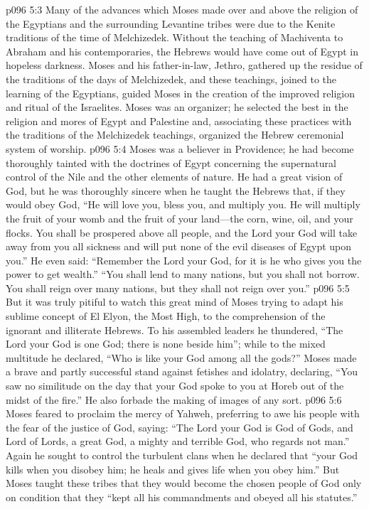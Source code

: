 \vs p096 5:3 Many of the advances which Moses made over and above the religion of the Egyptians and the surrounding Levantine tribes were due to the Kenite traditions of the time of Melchizedek. Without the teaching of Machiventa to Abraham and his contemporaries, the Hebrews would have come out of Egypt in hopeless darkness. Moses and his father\hyp{}in\hyp{}law, Jethro, gathered up the residue of the traditions of the days of Melchizedek, and these teachings, joined to the learning of the Egyptians, guided Moses in the creation of the improved religion and ritual of the Israelites. Moses was an organizer; he selected the best in the religion and mores of Egypt and Palestine and, associating these practices with the traditions of the Melchizedek teachings, organized the Hebrew ceremonial system of worship.
\pc \vs p096 5:4 Moses was a believer in Providence; he had become thoroughly tainted with the doctrines of Egypt concerning the supernatural control of the Nile and the other elements of nature. He had a great vision of God, but he was thoroughly sincere when he taught the Hebrews that, if they would obey God, “He will love you, bless you, and multiply you. He will multiply the fruit of your womb and the fruit of your land---the corn, wine, oil, and your flocks. You shall be prospered above all people, and the Lord your God will take away from you all sickness and will put none of the evil diseases of Egypt upon you.” He even said: “Remember the Lord your God, for it is he who gives you the power to get wealth.” “You shall lend to many nations, but you shall not borrow. You shall reign over many nations, but they shall not reign over you.”
\pc \vs p096 5:5 But it was truly pitiful to watch this great mind of Moses trying to adapt his sublime concept of El Elyon, the Most High, to the comprehension of the ignorant and illiterate Hebrews. To his assembled leaders he thundered, “The Lord your God is one God; there is none beside him”; while to the mixed multitude he declared, “Who is like your God among all the gods?” Moses made a brave and partly successful stand against fetishes and idolatry, declaring, “You saw no similitude on the day that your God spoke to you at Horeb out of the midst of the fire.” He also forbade the making of images of any sort.
\vs p096 5:6 Moses feared to proclaim the mercy of Yahweh, preferring to awe his people with the fear of the justice of God, saying: “The Lord your God is God of Gods, and Lord of Lords, a great God, a mighty and terrible God, who regards not man.” Again he sought to control the turbulent clans when he declared that “your God kills when you disobey him; he heals and gives life when you obey him.” But Moses taught these tribes that they would become the chosen people of God only on condition that they “kept all his commandments and obeyed all his statutes.”
